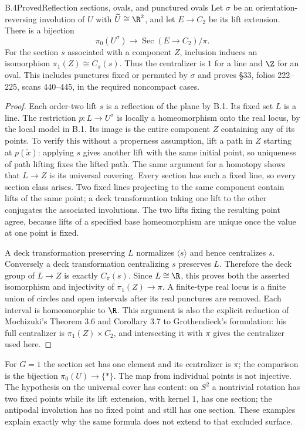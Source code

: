 \begin{claim}{B.4}{Proved}{Reflection sections, ovals, and punctured ovals}
Let $\sigma$ be an orientation-reversing involution of $U$ with
$\widetilde U\cong\R^2$, and let $E\to C_2$ be its lift extension. There is a
bijection
\[
 \pi_0(U^\sigma)\longrightarrow\operatorname{Sec}(E\to C_2)/\pi.
\]
For the section $s$ associated with a component $Z$, inclusion induces an
isomorphism $\pi_1(Z)\cong C_\pi(s)$. Thus the centralizer is $1$ for a line and
$\Z$ for an oval. This includes punctures fixed or permuted by $\sigma$ and proves
\S33, folios 222--225, scans 440--445, in the required noncompact cases.
\end{claim}
\begin{proof}
Each order-two lift $s$ is a reflection of the plane by B.1. Its fixed set
$L$ is a line. The restriction $p:L\to U^\sigma$ is locally a homeomorphism
onto the real locus, by the local model in B.1. Its image is the entire component
$Z$ containing any of its points. To verify this without a properness assumption,
lift a path in $Z$ starting at $p(\widetilde x)$: applying $s$ gives another lift
with the same initial point, so uniqueness of path lifting fixes the lifted path.
The same argument for a homotopy shows that $L\to Z$ is its universal covering.
Every section has such a fixed line, so every section class arises. Two fixed
lines projecting to the same component contain lifts of the same point; a deck
transformation taking one lift to the other conjugates the associated involutions.
The two lifts fixing the resulting point agree, because lifts of a specified
base homeomorphism are unique once the value at one point is fixed.

A deck transformation preserving $L$ normalizes $\langle s\rangle$ and hence
centralizes $s$. Conversely a deck transformation centralizing $s$ preserves
$L$. Therefore the deck group of $L\to Z$ is exactly $C_\pi(s)$. Since $L\cong\R$,
this proves both the asserted isomorphism and injectivity of $\pi_1(Z)\to\pi$.
A finite-type real locus is a finite union of circles and open intervals after
its real punctures are removed. Each interval is homeomorphic to $\R$.
This argument is also the explicit reduction of Mochizuki's Theorem 3.6 and
Corollary 3.7 \cite{bMochizuki2003} to Grothendieck's formulation: his full
centralizer is $\pi_1(Z)\times C_2$, and intersecting it with $\pi$ gives the
centralizer used here.
\end{proof}

For $G=1$ the section set has one element and its centralizer is $\pi$; the
comparison is the bijection $\pi_0(U)\to\{*\}$. The map from individual points
is not injective. The hypothesis on the universal cover has content: on $S^2$
a nontrivial rotation has two fixed points while its lift extension, with kernel
$1$, has one section; the antipodal involution has no fixed point and still has
one section. These examples explain exactly why the same formula does not extend
to that excluded surface.

